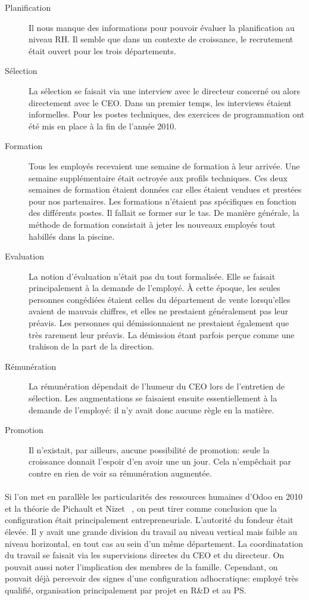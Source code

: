 \begin{description}
    \item[Planification] Il nous manque des informations pour pouvoir évaluer la planification au niveau RH. Il semble que dans un contexte de croissance, le recrutement était ouvert pour les trois départements.
    \item[Sélection] La sélection se faisait via une interview avec le directeur concerné ou alors directement avec le CEO. Dans un premier temps, les interviews étaient informelles. Pour les postes techniques, des exercices de programmation ont été mis en place à la fin de l'année 2010.
    \item[Formation] Tous les employés recevaient une semaine de formation à leur arrivée. Une semaine supplémentaire était octroyée aux profils techniques. Ces deux semaines de formation étaient données car elles étaient vendues et prestées pour nos partenaires. Les formations n'étaient pas spécifiques en fonction des différents postes. Il fallait se former sur le tas. De manière générale, la méthode de formation consistait à jeter les nouveaux employés tout habillés dans la piscine.
    \item[Evaluation] La notion d'évaluation n'était pas du tout formalisée. Elle se faisait principalement à la demande de l'employé. À cette époque, les seules personnes congédiées étaient celles du département de vente lorsqu'elles avaient de mauvais chiffres, et elles ne prestaient généralement pas leur préavis. Les personnes qui démissionnaient ne prestaient également que très rarement leur préavis. La démission étant parfois perçue comme une trahison de la part de la direction.
    \item[Rémunération] La rémunération dépendait de l'humeur du CEO lors de l'entretien de sélection. Les augmentations se faisaient ensuite essentiellement à la demande de l'employé: il n'y avait donc aucune règle en la matière. 
    \item[Promotion] Il n'existait, par ailleurs, aucune possibilité de promotion: seule la croissance donnait l'espoir d'en avoir une un jour. Cela n'empêchait par contre en rien de voir sa rémunération augmentée. 
\end{description}

 

\paragraph{}Si l'on met en parallèle les particularités des ressources humaines d'Odoo en 2010 et la théorie de Pichault et Nizet ~\citep[pp. 48-49]{pichault}, on peut tirer comme conclusion que la configuration était principalement entrepreneuriale. L'autorité du fondeur était élevée. Il y avait une grande division du travail au niveau vertical mais faible au niveau horizontal, en tout cas au sein d'un même département. La coordinatation du travail se faisait via les supervisions directes du CEO et du directeur. On pouvait aussi noter l'implication des membres de la famille. Cependant, on pouvait déjà percevoir des signes d'une configuration adhocratique: employé très qualifié, organisation principalement par projet en R\&D et au PS. 

